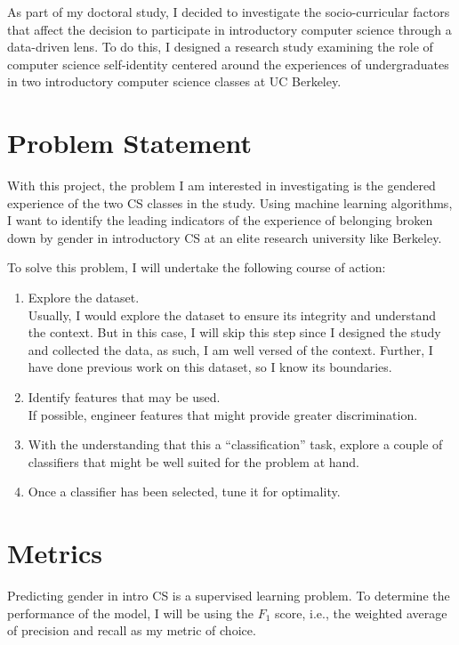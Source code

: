 As part of my doctoral study, I decided to investigate the socio-curricular factors that affect the decision to participate in introductory computer science through a data-driven lens. To do this, I designed a research study examining the role of computer science self-identity centered around the experiences of undergraduates in two introductory computer science classes at UC Berkeley. 


\section*{Problem Statement}

With this project, the problem I am interested in investigating is the gendered experience of the two CS classes in the study. Using machine learning algorithms, I want to identify the leading indicators of the experience of belonging broken down by gender in introductory CS at an elite research university like Berkeley.

To solve this problem, I will undertake the following course of action:
\begin{enumerate}%
\item Explore the dataset.\\
Usually, I would explore the dataset to ensure its integrity and understand the context. But in this case, I will skip this step since I designed the study and collected the data, as such, I am well versed of the context. Further, I have done previous work on this dataset, so I know its boundaries.
\item Identify features that may be used.\\ 
If possible, engineer features that might provide greater discrimination.
\item With the understanding that this a ``classification'' task, explore a couple of classifiers that might be well suited for the problem at hand.
\item Once a classifier has been selected, tune it for optimality.
\end{enumerate}

\section*{Metrics}


Predicting gender in intro CS is a supervised learning problem. To determine the performance of the model, I will be using the $F_1$ score, i.e., the weighted average of precision and recall as my metric of choice. 

